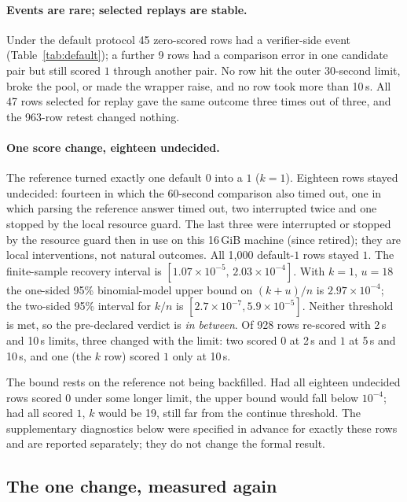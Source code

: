 \documentclass[10pt,a4paper]{article}
\begin{document}
\paragraph{Events are rare; selected replays are stable.}
Under the default protocol 45 zero-scored rows had a verifier-side event
(Table~\ref{tab:default}); a further 9 rows had a comparison error in one
candidate pair but still scored $1$ through another pair. No row hit the outer 30-second limit, broke the pool, or made the wrapper
raise, and no row took more than 10\,s. All 47 rows selected for replay gave
the same outcome three times out of three, and the 963-row retest changed
nothing.

\paragraph{One score change, eighteen undecided.}
The reference turned exactly one default $0$ into a $1$ ($k=1$). Eighteen rows
stayed undecided: fourteen in which the 60-second comparison also timed out,
one in which parsing the reference answer timed out, two interrupted twice and
one stopped by the local resource guard. The last three were interrupted or
stopped by the resource guard then in use on this 16\,GiB machine (since
retired); they are local interventions, not natural outcomes. All 1,000 default-$1$ rows stayed $1$.
The finite-sample recovery interval is
$[1.07\times10^{-5},\,2.03\times10^{-4}]$. With $k=1$, $u=18$ the
one-sided 95\% binomial-model upper bound on $(k+u)/n$ is
$2.97\times10^{-4}$; the two-sided 95\% interval for $k/n$ is
$[2.7\times10^{-7}, 5.9\times10^{-5}]$. Neither threshold is met, so the
pre-declared verdict is \emph{in between}. Of 928 rows re-scored with 2\,s
and 10\,s limits, three changed with the limit: two scored $0$ at 2\,s and $1$
at 5\,s and 10\,s, and one (the $k$ row) scored $1$ only at 10\,s.

The bound rests on the reference not being backfilled. Had all eighteen
undecided rows scored $0$ under some longer limit, the upper bound would fall
below $10^{-4}$; had all scored $1$, $k$ would be 19, still far from the
continue threshold. The supplementary diagnostics below were specified in
advance for exactly these rows and are reported separately; they do not
change the formal result.

\subsection{The one change, measured again}
\end{document}
